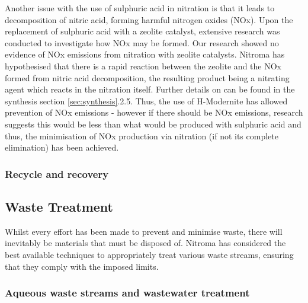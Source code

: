 Another issue with the use of sulphuric acid in nitration is that it leads to decomposition of nitric acid, forming harmful nitrogen oxides (NOx). Upon the replacement of sulphuric acid with a zeolite catalyst, extensive research was conducted to investigate how NOx may be formed. Our research showed no evidence of NOx emissions from nitration with zeolite catalysts. Nitroma has hypothesised that there is a rapid reaction between the zeolite and the NOx formed from nitric acid decomposition, the resulting product being a nitrating agent which reacts in the nitration itself. Further details on can be found in the synthesis section \ref{sec:synthesis}.2.5. Thus, the use of H-Modernite has allowed prevention of NOx emissions - however if there should be NOx emissions, research suggests this would be less than what would be produced with sulphuric acid and thus, the minimisation of NOx production via nitration (if not its complete elimination) has been achieved.  

\subsubsection{Recycle and recovery}


 






\subsection{Waste Treatment}

Whilst every effort has been made to prevent and minimise waste, there will inevitably be materials that must be disposed of. Nitroma has considered the best available techniques to appropriately treat various waste streams, ensuring that they comply with the imposed limits.  

\subsubsection{Aqueous waste streams and wastewater treatment}


